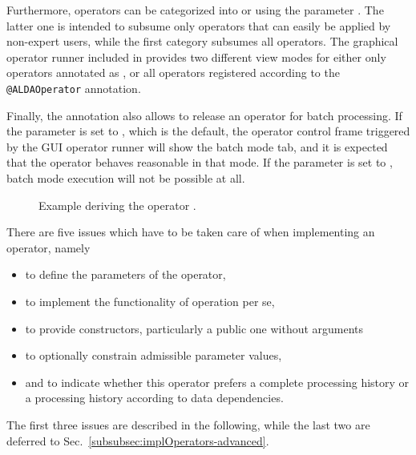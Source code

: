 Furthermore, operators can be categorized into 
or  using the parameter .
The latter one is intended to subsume only operators that can easily be applied by non-expert users,
while the first category subsumes all operators. The graphical operator runner included in \alida 
provides two different view modes for either only operators annotated as
, or all operators registered according to the
\texttt{@ALDAOperator} annotation.

Finally, the annotation also allows to release an operator for batch
processing. If the parameter  is set to ,
which is the default, the operator control frame triggered by the GUI operator
runner will show the batch mode tab, and it is expected that the operator
behaves reasonable in that mode. If the parameter is set to
, batch mode execution will not be possible at all.

\begin{figure}[h]

\caption{\label{exa:defineOp}Example deriving the operator .}
\end{figure}

There are five issues which have to be taken care of when implementing
an operator, namely
\begin{itemize}
\item	to define the parameters of the operator,
\item	to implement the functionality of operation per se,
\item 	to provide constructors, particularly a public one without arguments
\item	to optionally constrain admissible parameter values,
\item 	and to indicate whether
          this operator prefers a complete processing history
	or a processing history according to data dependencies.
\end{itemize}
The first three issues
are described in the following,
while the last two are deferred to Sec.~\ref{subsubsec:implOperators-advanced}.

